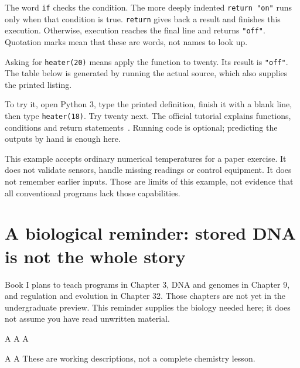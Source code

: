 The word \texttt{if} checks the condition. The more deeply indented \texttt{return "on"} runs only when that condition is true. \texttt{return} gives back a result and finishes this execution. Otherwise, execution reaches the final line and returns \texttt{"off"}. Quotation marks mean that these are words, not names to look up.

Asking for \texttt{heater(20)} means apply the function to twenty. Its result is \texttt{"off"}. The table below is generated by running the actual source, which also supplies the printed listing.


To try it, open Python 3, type the printed definition, finish it with a blank line, then type \texttt{heater(18)}. Try twenty next. The official tutorial explains functions, conditions and return statements~\cite{python}. Running code is optional; predicting the outputs by hand is enough here.

This example accepts ordinary numerical temperatures for a paper exercise. It does not validate sensors, handle missing readings or control equipment. It does not remember earlier inputs. Those are limits of this example, not evidence that all conventional programs lack those capabilities.

\clearpage
\section{A biological reminder: stored DNA is not the whole story}\label{sec:biology}
Book I plans to teach programs in Chapter 3, DNA and genomes in Chapter 9, and regulation and evolution in Chapter 32. Those chapters are not yet in the undergraduate preview. This reminder supplies the biology needed here; it does not assume you have read unwritten material.

A  A   A 

 A  A  These are working descriptions, not a complete chemistry lesson.

